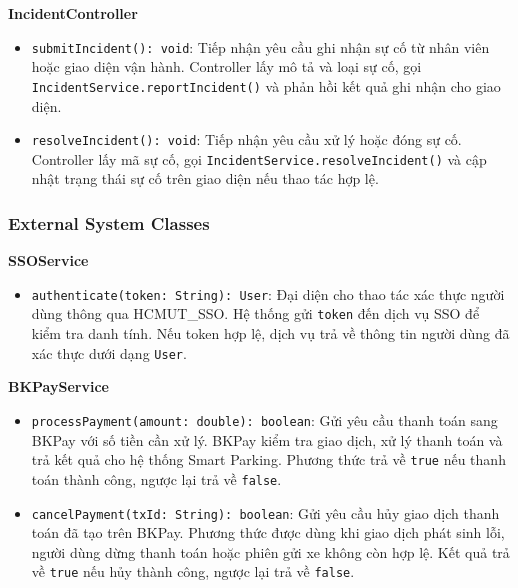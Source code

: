 \noindent\textbf{IncidentController}
\begin{itemize}
    \item \texttt{submitIncident(): void}: Tiếp nhận yêu cầu ghi nhận sự cố từ nhân viên hoặc giao diện vận hành. Controller lấy mô tả và loại sự cố, gọi \texttt{IncidentService.reportIncident()} và phản hồi kết quả ghi nhận cho giao diện.
    \item \texttt{resolveIncident(): void}: Tiếp nhận yêu cầu xử lý hoặc đóng sự cố. Controller lấy mã sự cố, gọi \texttt{IncidentService.resolveIncident()} và cập nhật trạng thái sự cố trên giao diện nếu thao tác hợp lệ.
\end{itemize}

\subsubsection{External System Classes}

\noindent\textbf{SSOService}
\begin{itemize}
    \item \texttt{authenticate(token: String): User}: Đại diện cho thao tác xác thực người dùng thông qua \mbox{HCMUT\_SSO}. Hệ thống gửi \texttt{token} đến dịch vụ SSO để kiểm tra danh tính. Nếu token hợp lệ, dịch vụ trả về thông tin người dùng đã xác thực dưới dạng \texttt{User}.
\end{itemize}

\noindent\textbf{BKPayService}
\begin{itemize}
    \item \texttt{processPayment(amount: double): boolean}: Gửi yêu cầu thanh toán sang BKPay với số tiền cần xử lý. BKPay kiểm tra giao dịch, xử lý thanh toán và trả kết quả cho hệ thống Smart Parking. Phương thức trả về \texttt{true} nếu thanh toán thành công, ngược lại trả về \texttt{false}.
    \item \texttt{cancelPayment(txId: String): boolean}: Gửi yêu cầu hủy giao dịch thanh toán đã tạo trên BKPay. Phương thức được dùng khi giao dịch phát sinh lỗi, người dùng dừng thanh toán hoặc phiên gửi xe không còn hợp lệ. Kết quả trả về \texttt{true} nếu hủy thành công, ngược lại trả về \texttt{false}.
\end{itemize}

